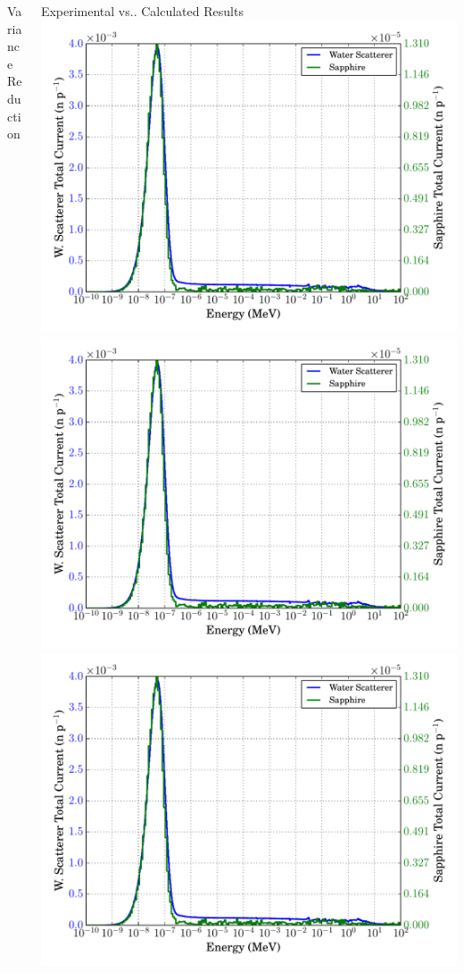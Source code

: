 \documentclass[final,t]{beamer}
\makeatletter
\DeclareRobustCommand\onedot{\futurelet\@let@token\@onedot}
\def\@onedot{\ifx\@let@token.\else.\null\fi\xspace}
\def\vs{{vs}\onedot}
\makeatother
\begin{document}
\begin{frame}{}
\begin{columns}[t]
\begin{column}{.3\linewidth}
\begin{block}{Variance Reduction}
      \end{block}

    \end{column}

    
    \begin{column}{.3\linewidth}

      \begin{block}{Experimental \vs Calculated Results}
        \centering
        \includegraphics[width=0.33\linewidth]{specs.pdf}%
        \includegraphics[width=0.33\linewidth]{specs.pdf}%
        \includegraphics[width=0.33\linewidth]{specs.pdf}%

        \begin{table}
        \end{table}
      \end{block}
      

\end{column}
\end{columns}
\end{frame}
\end{document}
